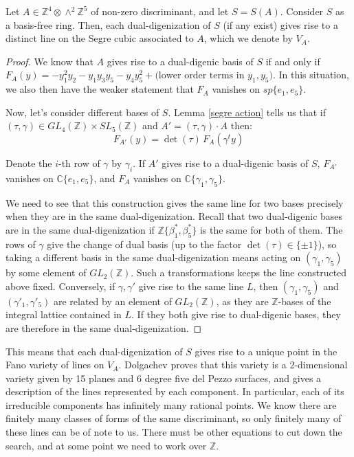\documentclass{report}
\begin{document}
\begin{lemma} \label{distinct lines}
Let $A \in \mathbb{Z}^4 \otimes \wedge^2 \mathbb{Z}^5$ of non-zero discriminant, and let $S = S(A)$.  Consider $S$ as a basis-free ring.  Then, each dual-digenization of $S$ (if any exist) gives rise to a distinct line on the Segre cubic associated to $A$, which we denote by $V_A$.
\end{lemma}

\begin{proof}
We know that $A$ gives rise to a dual-digenic basis of $S$ if and only if $F_A(y) = - y_1^2 y_2 - y_1 y_3 y_5 - y_4 y_5^2 + \text{(lower order terms in $y_1, y_5$)}$.  In this situation, we also then have the weaker statement that $F_A$ vanishes on $sp\{e_1,e_5\}$.

Now, let's consider different bases of $S$.  Lemma \ref{segre action} tells us that if $(\tau,\gamma) \in GL_4(\mathbb{Z}) \times SL_5(\mathbb{Z})$ and $A' = (\tau,\gamma) \cdot A$ then:
\begin{equation}
F_{A'}(y) = \det(\tau) \, F_A(\gamma^t y)
\end{equation}

Denote the $i$-th row of $\gamma$ by $\gamma_i$.  If $A'$ gives rise to a dual-digenic basis of $S$, $F_{A'}$ vanishes on $\mathbb{C} \{e_1,e_5\}$, and $F_A$ vanishes on $\mathbb{C} \{\gamma_1,\gamma_5\}$.

We need to see that this construction gives the same line for two bases precisely when they are in the same dual-digenization.  Recall that two dual-digenic bases are in the same dual-digenization if $\mathbb{Z}\{\beta_1^*,\beta_5^*\}$ is the same for both of them.  The rows of $\gamma$ give the change of dual basis (up to the factor $\det(\tau) \in \{ \pm 1 \}$), so taking a different basis in the same dual-digenization means acting on $( \gamma_1, \gamma_5 )$ by some element of $GL_2(\mathbb{Z})$.  Such a transformations keeps the line constructed above fixed.  Conversely, if $\gamma, \gamma'$ give rise to the same line $L$, then $(\gamma_1,\gamma_5)$ and $(\gamma'_1, \gamma'_5)$ are related by an element of $GL_2(\mathbb{Z})$, as they are $\mathbb{Z}$-bases of the integral lattice contained in $L$.  If they both give rise to dual-digenic bases, they are therefore in the same dual-digenization.
\end{proof}

This means that each dual-digenization of $S$ gives rise to a unique point in the Fano variety of lines on $V_A$.  Dolgachev proves that this variety is a 2-dimensional variety given by 15 planes and 6 degree five del Pezzo surfaces, and gives a description of the lines represented by each component.  In particular, each of its irreducible components has infinitely many rational points.  We know there are finitely many classes of forms of the same discriminant, so only finitely many of these lines can be of note to us.  There must be other equations to cut down the search, and at some point we need to work over $\mathbb{Z}$.
\end{document}
